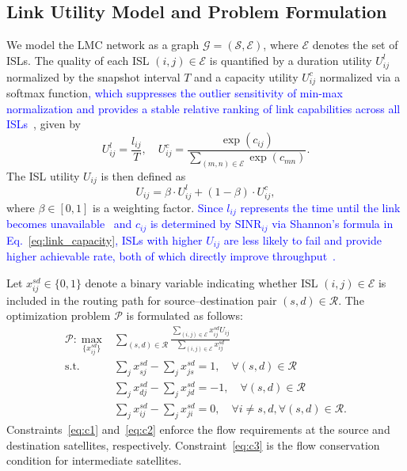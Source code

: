 \subsection{Link Utility Model and Problem Formulation}

We model the LMC network as a graph $\mathcal{G} = (\mathcal{S}, \mathcal{E})$, where $\mathcal{E}$ denotes the set of ISLs. The quality of each ISL $(i,j) \in \mathcal{E}$ is quantified by a duration utility $U_{ij}^l$ normalized by the snapshot interval $T$ and a capacity utility $U_{ij}^c$ normalized via a softmax function\textcolor{blue}{, which suppresses the outlier sensitivity of min-max normalization and provides a stable relative ranking of link capabilities across all ISLs~\cite{fu2024softact}}, given by
\begin{equation} \label{eq:utility_components}
    U_{ij}^l = \frac{l_{ij}}{T}, \quad U_{ij}^c = \frac{\exp(c_{ij})}{\sum_{(m,n) \in \mathcal{E}} \exp(c_{mn})}.
\end{equation}
The ISL utility $U_{ij}$ is then defined as
\begin{equation} \label{eq:utility_def}
U_{ij} = \beta \cdot U_{ij}^l + (1-\beta) \cdot U_{ij}^c,
\end{equation}
where $\beta \in [0,1]$ is a weighting factor. \textcolor{blue}{Since $l_{ij}$ represents the time until the link becomes unavailable~\cite{han2023time} and $c_{ij}$ is determined by $\mathrm{SINR}_{ij}$ via Shannon's formula in Eq.~\eqref{eq:link_capacity}, ISLs with higher $U_{ij}$ are less likely to fail and provide higher achievable rate, both of which directly improve throughput~\cite{wang2023reliability}.}

Let $x_{ij}^{sd} \in \{0, 1\}$ denote a binary variable indicating whether ISL $(i,j) \in \mathcal{E}$ is included in the routing path for source--destination pair $(s,d) \in \mathcal{R}$. The optimization problem $\mathcal{P}$ is formulated as follows:
\begin{subequations} \label{eq:problem_formulation}
\begin{align}
\mathcal{P}: \max_{\{x_{ij}^{sd}\}} & \sum_{(s,d) \in \mathcal{R}} \frac{\sum_{(i,j)\in\mathcal{E}} x_{ij}^{sd} U_{ij}}{\sum_{(i,j)\in\mathcal{E}} x_{ij}^{sd}} \label{eq:obj} \\
\text{s.t.} \quad & \sum_{j} x_{sj}^{sd} - \sum_{j} x_{js}^{sd} = 1, \quad \forall (s,d)\in\mathcal{R} \label{eq:c1} \\
& \sum_{j} x_{dj}^{sd} - \sum_{j} x_{jd}^{sd} = -1, \quad \forall (s,d)\in\mathcal{R} \label{eq:c2} \\
& \sum_{j} x_{ij}^{sd} - \sum_{j} x_{ji}^{sd} = 0, \quad \forall i \neq s,d, \forall (s,d)\in\mathcal{R}. \label{eq:c3}
\end{align}
\end{subequations}
Constraints~\eqref{eq:c1} and~\eqref{eq:c2} enforce the flow requirements at the source and destination satellites, respectively. Constraint~\eqref{eq:c3} is the flow conservation condition for intermediate satellites.
